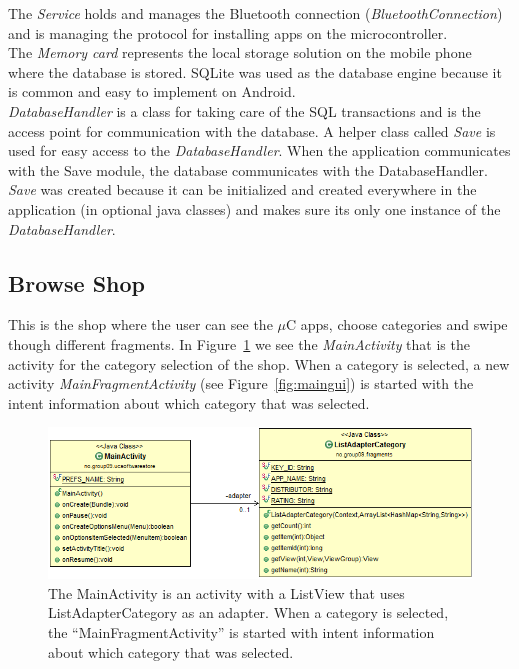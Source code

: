 	The \textit{Service} holds and manages the Bluetooth connection (\textit{BluetoothConnection}) and is managing the protocol for installing apps on the microcontroller. \\

	The \textit{Memory card} represents the local storage solution on the mobile phone where the database is stored. SQLite was used as the database engine because it is common and easy to implement on Android.\\

	\textit{DatabaseHandler} is a class for taking care of the SQL transactions and is the access point for communication with the database. A helper class called \textit{Save} is used for easy access to the \textit{DatabaseHandler}.
	When the application communicates with the Save module, the database communicates with the DatabaseHandler.
	\textit{Save} was created because it can be initialized and created everywhere in the application (in optional java classes) and makes sure its only one instance of the \textit{DatabaseHandler}.

	\subsection{Browse Shop}
	This is the shop where the user can see the $\mu$C apps, choose categories and swipe though different fragments. In  Figure~\ref{fig:categoriesuml} we see the \textit{MainActivity} that is the activity for the category selection of the shop. 
	When a category is selected, a new activity \textit{MainFragmentActivity} (see Figure~\ref{fig:maingui}) is started with the intent information about which category that was selected.

	\begin{figure}[H]
	\centering
	\includegraphics[scale=0.85]{images/UML/categories.png}
	\caption[UML - Categories]{The MainActivity is an activity with a ListView that uses ListAdapterCategory as an adapter. When a category is selected, the ``MainFragmentActivity'' is started with intent information about which category that was selected.}
	\label{fig:categoriesuml}
	\end{figure}

